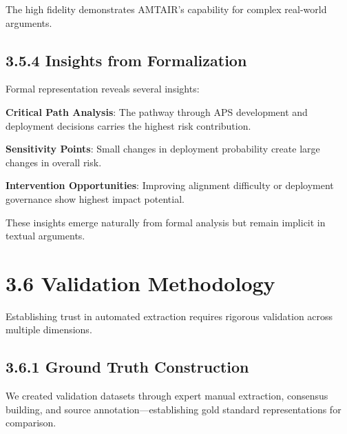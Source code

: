 \documentclass[
  11pt,
  letterpaper,
]{book}
\begin{document}
The high fidelity demonstrates AMTAIR's capability for complex
real-world arguments.

\subsection*{3.5.4 Insights from
Formalization}\label{sec-carlsmith-insights}

Formal representation reveals several insights:

\textbf{Critical Path Analysis}: The pathway through APS development and
deployment decisions carries the highest risk contribution.

\textbf{Sensitivity Points}: Small changes in deployment probability
create large changes in overall risk.

\textbf{Intervention Opportunities}: Improving alignment difficulty or
deployment governance show highest impact potential.

These insights emerge naturally from formal analysis but remain implicit
in textual arguments.

\section*{3.6 Validation Methodology}\label{sec-validation-methodology}


Establishing trust in automated extraction requires rigorous validation
across multiple dimensions.

\subsection*{3.6.1 Ground Truth Construction}\label{sec-ground-truth}

\begin{tcolorbox}[enhanced jigsaw, opacityback=0, leftrule=.75mm, breakable, coltitle=black, colbacktitle=quarto-callout-note-color!10!white, bottomrule=.15mm, rightrule=.15mm, toprule=.15mm, left=2mm, bottomtitle=1mm, arc=.35mm, toptitle=1mm, titlerule=0mm, title=\textcolor{quarto-callout-note-color}{\faInfo}\hspace{0.5em}{Validation Protocol}, opacitybacktitle=0.6, colframe=quarto-callout-note-color-frame, colback=white]

We created validation datasets through expert manual extraction,
consensus building, and source annotation---establishing gold standard
representations for comparison.

\end{tcolorbox}
\end{document}
